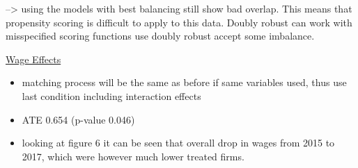 \documentclass[11pt,a4paper,leqno]{article}
\begin{document}
\begin{itemize}
	\begin{comment}
		\item try 1: matching with 2 nearest neighbors using a logit scoring function
		\begin{itemize}
			\item unbalanced in log employment, medium low and medium high tech industries, independently and state owned firms and those with close ports.. 
			\item overlap quite bad. majority of FDI=0 on left, majority of FDI=1 on right
		\end{itemize}
		\item try 2: matching with 4 nearest neighbors using a logit scoring function and caliper 0.10
		\begin{itemize}
			\item unbalanced in log employment, export intensity, debts and those with close ports.. 
			\item overlap quite bad. majority of FDI=0 on left, majority of FDI=1 on right
		\end{itemize}
		\item try 3: matching with 2 nearest neighbors using a probit scoring function
		\begin{itemize}
			\item unbalanced in TFP, log employment, medium low tech industry firms and independent and state owned firms and those with close ports.. 
			\item overlap quite bad. majority of FDI=0 on left, majority of FDI=1 on right
		\end{itemize}
		\item try 4: matching with 4 nearest neighbours caliper of 0.1, a logit scoring function including interaction effects
		\begin{itemize}
			\item no imbalances with matched differences larger than 0.20
			\item overlap unchanged
			\item ATE 0.745 (p-value 0.023)
		\end{itemize}
	\end{comment}

--> using the models with best balancing still show bad overlap. This means that propensity scoring is difficult to apply to this data. Doubly robust can work with misspecified scoring functions use doubly robust accept some imbalance. 
	
	\underline{Wage Effects}
	\begin{itemize}
		\item matching process will be the same as before if same variables used, thus use last condition including interaction effects
		\item ATE 0.654 (p-value 0.046)
		\item looking at figure 6 it can be seen that overall drop in wages from 2015 to 2017, which were however much lower treated firms.
	\end{itemize}
	
	
\end{itemize}
\end{document}
